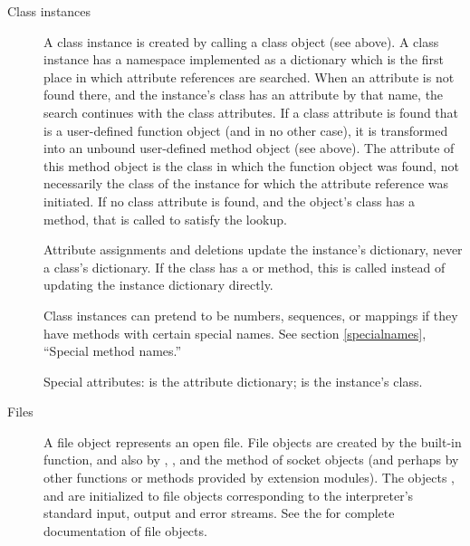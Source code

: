 \begin{description}
\item[Class instances]
A class instance is created by calling a class object (see above).
A class instance has a namespace implemented as a dictionary which
is the first place in which
attribute references are searched.  When an attribute is not found
there, and the instance's class has an attribute by that name,
the search continues with the class attributes.  If a class attribute
is found that is a user-defined function object (and in no other
case), it is transformed into an unbound user-defined method object
(see above).  The  attribute of this method object is
the class in which the function object was found, not necessarily the
class of the instance for which the attribute reference was initiated.
If no class attribute is found, and the object's class has a
 method, that is called to satisfy the lookup.

Attribute assignments and deletions update the instance's dictionary,
never a class's dictionary.  If the class has a  or
 method, this is called instead of updating the
instance dictionary directly.

Class instances can pretend to be numbers, sequences, or mappings if
they have methods with certain special names.  See
section \ref{specialnames}, ``Special method names.''

Special attributes:  is the attribute
dictionary;  is the instance's class.

\item[Files]
A file object represents an open file.  File objects are
created by the  built-in function,
and also by
,
, and the
method of socket objects (and perhaps by other functions or methods
provided by extension modules).  The objects
,
 and
 are initialized to file objects
corresponding to the interpreter's standard input, output
and error streams.  See the  for complete documentation of file objects.



\end{description}
